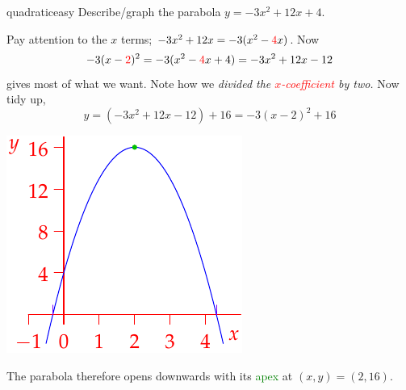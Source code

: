 \begin{example}{}{quadraticeasy}
Describe/graph the parabola $y=-3x^2+12x+4$.\par
\begin{minipage}[t]{0.62\linewidth}\vspace{-5pt}
Pay attention to the $x$ terms; $-3x^2+12x=-3(x^2-\textcolor{red}{4}x)$. Now
\[-3(x-\textcolor{red}{2})^2=-3(x^2-\textcolor{red}{4}x+4)=-3x^2+12x-12\]
gives most of what we want. Note how we \emph{divided the \textcolor{red}{$x$-coefficient} by two.} Now tidy up,
\[y=(-3x^2+12x-12)+16=-3(x-2)^2+16\]
\end{minipage}\hfill\begin{minipage}[t]{0.27\linewidth}\vspace{-15pt}
\flushright\includegraphics[scale=0.9]{poly-quad2}
\end{minipage}\medbreak
The parabola therefore opens downwards with its \textcolor{Green}{apex} at $(x,y)=(2,16)$.
\end{example}

